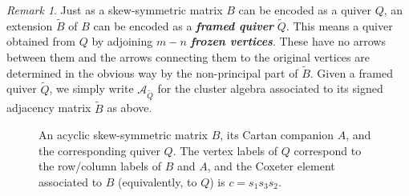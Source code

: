 \documentclass[12pt]{amsart}
\newcommand{\sayDR}[1]{\say[DR]{\color{red}{\bf DR:}\;#1}}
\newcommand{\newword}[1]{\textbf{\emph{#1}}}
\newcommand{\cA}{\mathcal{A}}
\theoremstyle{remark}
\newtheorem{remark}[theorem]{Remark}
\numberwithin{equation}{section}
\numberwithin{figure}{section}
\begin{document}
\begin{remark}
  Just as a skew-symmetric matrix $B$ can be encoded as a quiver $Q$, an extension $\widetilde{B}$ of $B$ can be encoded as a \newword{framed quiver} $\widetilde{Q}$.
  This means a quiver obtained from $Q$ by adjoining $m -  n$ \newword{frozen vertices}.
  These have no arrows between them and the arrows connecting them to the original vertices are determined in the obvious way %
by the non-principal part of $\widetilde{B}$.
  Given a framed quiver $\widetilde{Q}$, we simply write $\cA_{\widetilde{Q}}$ for the cluster algebra associated to its signed adjacency matrix $\widetilde{B}$ as above.
\end{remark}

\begin{figure}
  \centering
  \caption{
    An acyclic skew-symmetric matrix $B$, its Cartan companion $A$, and the corresponding quiver $Q$.
    The vertex labels of $Q$ correspond to the row/column labels of $B$ and $A$, and the Coxeter element associated to $B$ (equivalently, to $Q$) is $c = s_1 s_3 s_2$.
  }
  \label{fig:matrices}
\end{figure}
\end{document}
